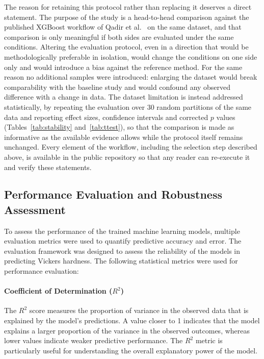 \documentclass[pdflatex,sn-mathphys-num]{sn-jnl}%
\newif\ifrevmarks%
\newcommand{\revmark}[1]{\ifrevmarks\textcolor{revblue}{#1}\else#1\fi}%
\theoremstyle{thmstyleone}%
\theoremstyle{thmstyletwo}%
\theoremstyle{thmstylethree}%
\begin{document}
\revmark{The reason for retaining this protocol rather than replacing it deserves a direct statement. The purpose of the study is a head-to-head comparison against the published XGBoost workflow of Qadir et al.~\cite{qadir2024predicting} on the same dataset, and that comparison is only meaningful if both sides are evaluated under the same conditions. Altering the evaluation protocol, even in a direction that would be methodologically preferable in isolation, would change the conditions on one side only and would introduce a bias against the reference method. For the same reason no additional samples were introduced: enlarging the dataset would break comparability with the baseline study and would confound any observed difference with a change in data. The dataset limitation is instead addressed statistically, by repeating the evaluation over 30 random partitions of the same data and reporting effect sizes, confidence intervals and corrected $p$ values (Tables~\ref{tab:stability} and~\ref{tab:ttest}), so that the comparison is made as informative as the available evidence allows while the protocol itself remains unchanged. Every element of the workflow, including the selection step described above, is available in the public repository so that any reader can re-execute it and verify these statements.}


\subsection{Performance Evaluation and Robustness Assessment}

To assess the performance of the trained machine learning models, multiple evaluation metrics were used to quantify predictive accuracy and error. The evaluation framework was designed to assess the reliability of the models in predicting Vickers hardness. The following statistical metrics were used for performance evaluation:  

\paragraph{Coefficient of Determination ($R^2$)}  
The $R^2$ score measures the proportion of variance in the observed data that is explained by the model’s predictions. A value closer to 1 indicates that the model explains a larger proportion of the variance in the observed outcomes, whereas lower values indicate weaker predictive performance. The $R^2$ metric is particularly useful for understanding the overall explanatory power of the model.  
\end{document}
